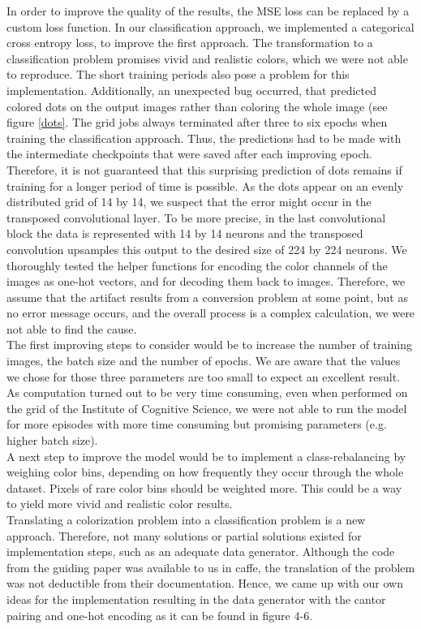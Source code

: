 \documentclass[12pt,letterpaper]{article}
\begin{document}
In order to improve the quality of the results, the MSE loss can be replaced by a custom loss function. In our classification approach, we implemented a categorical cross entropy loss, to improve the first approach. The transformation to a classification problem promises vivid and realistic colors, which we were not able to reproduce. The short training periods also pose a problem for this implementation. Additionally, an unexpected bug occurred, that predicted colored dots on the output images rather than coloring the whole image (see figure \ref{dots}. The grid jobs always terminated after three to six epochs when training the classification approach. Thus, the predictions had to be made with the intermediate checkpoints that were saved after each improving epoch. Therefore, it is not guaranteed that this surprising prediction of dots remains if training for a longer period of time is possible. As the dots appear on an evenly distributed grid of 14 by 14, we suspect that the error might occur in the transposed convolutional layer. To be more precise, in the last convolutional block the data is represented with 14 by 14 neurons and the transposed convolution upsamples this output to the desired size of 224 by 224 neurons. We thoroughly tested the helper functions for encoding the color channels of the images as one-hot vectors, and for decoding them back to images. Therefore, we assume that the artifact results from a conversion problem at some point, but as no error message occurs, and the overall process is a complex calculation, we were not able to find the cause.\\
The first improving steps to consider would be to increase the number of training images, the batch size and the number of epochs. We are aware that the values we chose for those three parameters are too small to expect an excellent result. As computation turned out to be very time consuming, even when performed on the grid of the Institute of Cognitive Science, we were not able to run the model for more episodes with more time consuming but promising parameters (e.g. higher batch size).\\
A next step to improve the model would be to implement a class-rebalancing by weighing color bins, depending on how frequently they occur through the whole dataset. Pixels of rare color bins should be weighted more. This could be a way to yield more vivid and realistic color results.\\
Translating a colorization problem into a classification problem is a new approach. Therefore, not many solutions or partial solutions existed for implementation steps, such as an adequate data generator. Although the code from the guiding paper was available to us in caffe, the translation of the problem was not deductible from their documentation. Hence, we came up with our own ideas for the implementation resulting in the data generator with the cantor pairing and one-hot encoding as it can be found in figure 4-6.\\
\end{document}
